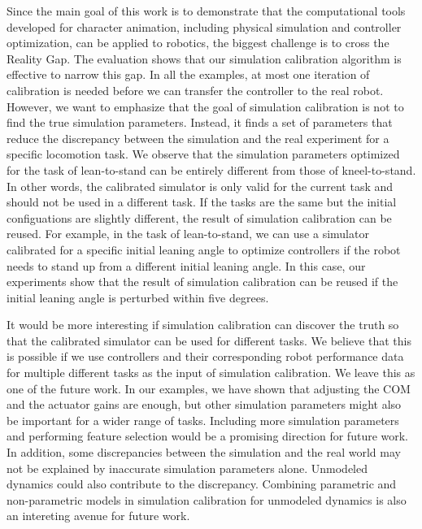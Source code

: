 Since the main goal of this work is to demonstrate that the computational tools developed for character animation, including physical simulation and controller optimization, can be applied to robotics, the biggest challenge is to cross the Reality Gap. The evaluation shows that our simulation calibration algorithm is effective to narrow this gap. In all the examples, at most one iteration of calibration is needed before we can transfer the controller to the real robot. However, we want to emphasize that the goal of simulation calibration is not to find the  true simulation parameters. Instead, it finds a set of parameters that reduce the discrepancy between the simulation and the real experiment for a specific locomotion task. We observe that the simulation parameters optimized for the task of lean-to-stand can be entirely different from those of kneel-to-stand. In other words, the calibrated simulator is only valid for the current task and should not be used in a different task. If the tasks are the same but the initial configuations are slightly different, the result of simulation calibration can be reused. For example, in the task of lean-to-stand, we can use a simulator calibrated for a specific initial leaning angle to optimize controllers if the robot needs to stand up from a different initial leaning angle. In this case, our experiments show that the result of simulation calibration can be reused if the initial leaning angle is perturbed within five degrees. 

It would be more interesting if simulation calibration can discover the truth so that the calibrated simulator can be used for different tasks. We believe that this is possible if we use controllers and their corresponding robot performance data for multiple different tasks as the input of simulation calibration. We leave this as one of the future work. In our examples, we have shown that adjusting the COM and the actuator gains are enough, but other simulation parameters might also be important for a wider range of tasks. Including more simulation parameters and performing feature selection would be a promising direction for future work. In addition, some discrepancies between the simulation and the real world may not be explained by inaccurate simulation parameters alone. Unmodeled dynamics could also contribute to the discrepancy. Combining parametric and non-parametric models in simulation calibration for unmodeled dynamics is also an intereting avenue for future work.


